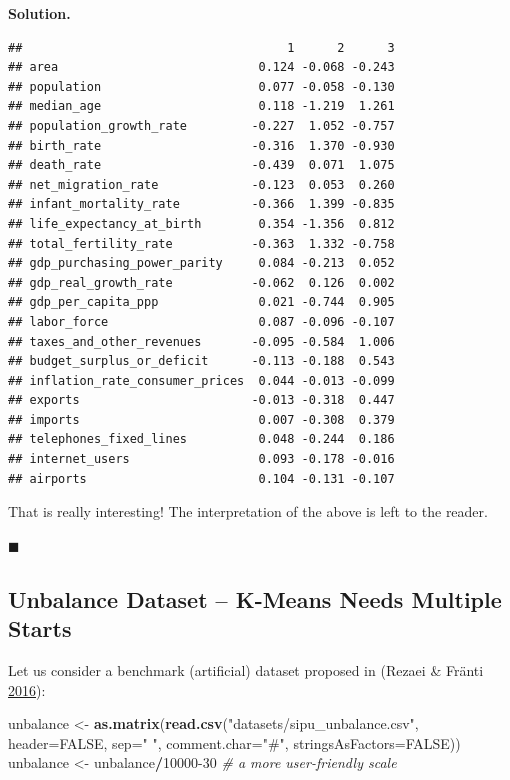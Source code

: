 \documentclass[10pt,b5paper,krantz1]{krantz}
\newenvironment{Shaded}{\begin{snugshade}}{\end{snugshade}}
\newcommand{\CommentTok}[1]{\textcolor[rgb]{0.37,0.37,0.37}{\textit{#1}}}
\newcommand{\DataTypeTok}[1]{\textcolor[rgb]{0.27,0.27,0.27}{#1}}
\newcommand{\DecValTok}[1]{\textcolor[rgb]{0.06,0.06,0.06}{#1}}
\newcommand{\KeywordTok}[1]{\textcolor[rgb]{0.27,0.27,0.27}{\textbf{#1}}}
\newcommand{\NormalTok}[1]{#1}
\newcommand{\OperatorTok}[1]{\textcolor[rgb]{0.43,0.43,0.43}{\textbf{#1}}}
\newcommand{\OtherTok}[1]{\textcolor[rgb]{0.37,0.37,0.37}{#1}}
\newcommand{\StringTok}[1]{\textcolor[rgb]{0.5,0.5,0.5}{#1}}
\newenvironment{solution}{%
\bigskip\noindent\textbf{Solution. }%
\it\ignorespaces%
\ignorespaces%
}{\ignorespaces%
\hfill$\blacksquare$%
}
\begin{document}
\begin{solution}
\begin{verbatim}
##                                     1      2      3
## area                            0.124 -0.068 -0.243
## population                      0.077 -0.058 -0.130
## median_age                      0.118 -1.219  1.261
## population_growth_rate         -0.227  1.052 -0.757
## birth_rate                     -0.316  1.370 -0.930
## death_rate                     -0.439  0.071  1.075
## net_migration_rate             -0.123  0.053  0.260
## infant_mortality_rate          -0.366  1.399 -0.835
## life_expectancy_at_birth        0.354 -1.356  0.812
## total_fertility_rate           -0.363  1.332 -0.758
## gdp_purchasing_power_parity     0.084 -0.213  0.052
## gdp_real_growth_rate           -0.062  0.126  0.002
## gdp_per_capita_ppp              0.021 -0.744  0.905
## labor_force                     0.087 -0.096 -0.107
## taxes_and_other_revenues       -0.095 -0.584  1.006
## budget_surplus_or_deficit      -0.113 -0.188  0.543
## inflation_rate_consumer_prices  0.044 -0.013 -0.099
## exports                        -0.013 -0.318  0.447
## imports                         0.007 -0.308  0.379
## telephones_fixed_lines          0.048 -0.244  0.186
## internet_users                  0.093 -0.178 -0.016
## airports                        0.104 -0.131 -0.107
\end{verbatim}

That is really interesting! The interpretation of the above is left
to the reader.

\end{solution}

\hypertarget{unbalance-dataset-k-means-needs-multiple-starts}{%
\subsection{Unbalance Dataset -- K-Means Needs Multiple Starts}\label{unbalance-dataset-k-means-needs-multiple-starts}}

Let us consider a benchmark (artificial) dataset
proposed in (Rezaei \& Fränti \protect\hyperlink{ref-external_cluster_validity}{2016}):

\begin{Shaded}
\begin{Highlighting}[]
\NormalTok{unbalance <-}\StringTok{ }\KeywordTok{as.matrix}\NormalTok{(}\KeywordTok{read.csv}\NormalTok{(}\StringTok{"datasets/sipu_unbalance.csv"}\NormalTok{,}
    \DataTypeTok{header=}\OtherTok{FALSE}\NormalTok{, }\DataTypeTok{sep=}\StringTok{" "}\NormalTok{, }\DataTypeTok{comment.char=}\StringTok{"#"}\NormalTok{,}
    \DataTypeTok{stringsAsFactors=}\OtherTok{FALSE}\NormalTok{))}
\NormalTok{unbalance <-}\StringTok{ }\NormalTok{unbalance}\OperatorTok{/}\DecValTok{10000-30} \CommentTok{# a more user-friendly scale}
\end{Highlighting}
\end{Shaded}
\end{document}
